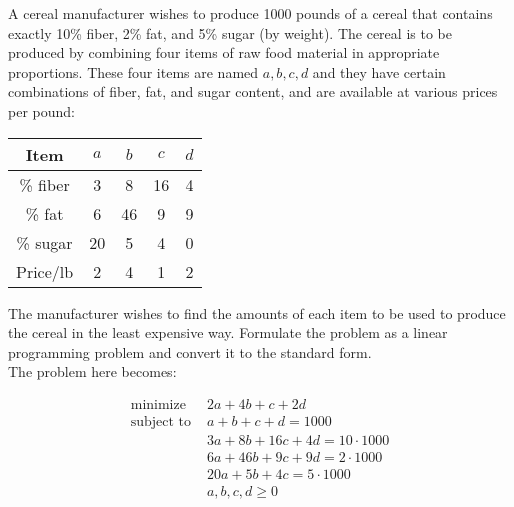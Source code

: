 \documentclass[12pt]{extarticle}
\theoremstyle{definition}
\begin{document}
\begin{problem}
	 A cereal manufacturer wishes to produce 1000 pounds of a cereal that contains exactly 10\% fiber, 2\% fat, and 5\% sugar (by weight). The cereal is to be produced by combining four items of raw food material in appropriate proportions. These four items are named $a, b, c, d$ and they have certain combinations of fiber, fat, and sugar content, and are available at various prices per pound:
	\begin{center}
	 \begin{tabular}{||c | c c c c||} 
	 \hline
	 Item  & $a$ & $b$ & $c$ & $d$ \\ [0.5ex] 
	 \hline\hline
	\% fiber & 3 & 8 & 16 & 4 \\ 
	 \hline
	 \% fat & 6 & 46 & 9 & 9 \\
	 \hline
	 \% sugar & 20 & 5 & 4 & 0 \\
	 \hline
	 Price/lb & 2 & 4 & 1 & 2 \\ [1ex] 
	 \hline
	\end{tabular}
	\end{center}
	The manufacturer wishes to find the amounts of each item to be used to produce the cereal in the least expensive way. Formulate the problem as a linear programming problem and convert it to the standard form.\\


	The problem here becomes:

	\begin{align*}
	\text{minimize } &2a + 4b + c + 2d\\
	\text{subject to } &a + b + c + d = 1000\\
	&3a + 8b + 16c + 4d = 10\cdot 1000\\
	&6a + 46b + 9c + 9d = 2\cdot 1000\\
	&20a + 5b + 4c = 5\cdot 1000\\
	&a, b, c, d \geq 0
	\end{align*} 

\end{problem}
\end{document}
